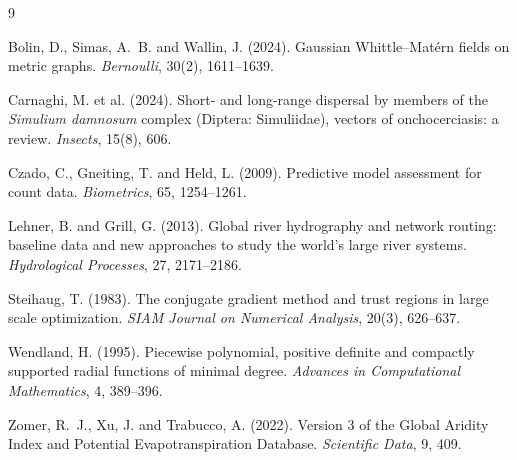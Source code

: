 \documentclass[11pt,a4paper]{article}
\begin{document}
\begin{thebibliography}{9}

Bolin, D., Simas, A.~B. and Wallin, J. (2024).
\newblock Gaussian Whittle--Mat\'ern fields on metric graphs.
\newblock \textit{Bernoulli}, 30(2), 1611--1639.

Carnaghi, M. et al. (2024).
\newblock Short- and long-range dispersal by members of the \textit{Simulium damnosum} complex (Diptera: Simuliidae), vectors of onchocerciasis: a review.
\newblock \textit{Insects}, 15(8), 606.

Czado, C., Gneiting, T. and Held, L. (2009).
\newblock Predictive model assessment for count data.
\newblock \textit{Biometrics}, 65, 1254--1261.

Lehner, B. and Grill, G. (2013).
\newblock Global river hydrography and network routing: baseline data and new approaches to study the world's large river systems.
\newblock \textit{Hydrological Processes}, 27, 2171--2186.

Steihaug, T. (1983).
\newblock The conjugate gradient method and trust regions in large scale optimization.
\newblock \textit{SIAM Journal on Numerical Analysis}, 20(3), 626--637.

Wendland, H. (1995).
\newblock Piecewise polynomial, positive definite and compactly supported radial functions of minimal degree.
\newblock \textit{Advances in Computational Mathematics}, 4, 389--396.

Zomer, R.~J., Xu, J. and Trabucco, A. (2022).
\newblock Version 3 of the Global Aridity Index and Potential Evapotranspiration Database.
\newblock \textit{Scientific Data}, 9, 409.

\end{thebibliography}
\end{document}
